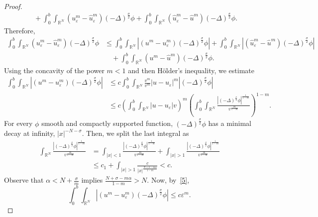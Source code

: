 \documentclass[leqno,12pt]{amsart}
\theoremstyle{definition}
\theoremstyle{remark}
\numberwithin{equation}{section}
\begin{document}
\begin{proof}
\begin{align*}
    &\quad+ \int_{0}^{b}\int_{\mathbb{R}^N}(u_{\varepsilon}^m-\hat{u}_{\varepsilon}^m)(-\Delta)^{\frac\sigma2}\phi+ \int_{0}^{b}\int_{\mathbb{R}^N}(\hat{u}_{\varepsilon}^m-\hat{u}^m)(-\Delta)^{\frac\sigma2}\phi.
\end{align*}
Therefore,
\begin{equation}\label{eq:decomposition}
\begin{aligned}
    \int_{0}^{b}\int_{\mathbb{R}^N}(u_{\varepsilon}^m-\hat{u}_{\varepsilon}^m)(-\Delta)^{\frac\sigma2}\phi&\leq
    \int_{0}^{b}\int_{\mathbb{R}^N}|(u^m-u_{\varepsilon}^m)(-\Delta)^{\frac\sigma2}\phi|
    +\int_{0}^{b}\int_{\mathbb{R}^N}|(\hat{u}_{\varepsilon}^m-\hat{u}^m)(-\Delta)^{\frac\sigma2}\phi|\\
    &\quad +\int_{0}^{b}\int_{\mathbb{R}^N}(u^m-\hat{u}^m)(-\Delta)^{\frac\sigma2}\phi.
\end{aligned}
\end{equation} 
 Using the concavity of the power $m<1$ and then Hölder's inequality, we estimate
\begin{align*}
    \int_{0}^{b}\int_{\mathbb{R}^N}|(u^m-u_{\varepsilon}^m)(-\Delta)^{\frac\sigma2}\phi|&\le c \int_{0}^{b}\int_{\mathbb{R}^N}\frac{v^m}{v^m}|u-u_{\varepsilon}|^m|(-\Delta)^{\frac\sigma2}\phi|
 \\
 &\le c
 \left( \int_{0}^{b}\int_{\mathbb{R}^N}|u-u_{\varepsilon}|v\right)^m
 \left( \int_{0}^{b}\int_{\mathbb{R}^N}\frac{|(- \Delta)^{\frac\sigma2}\phi|^{\frac{1}{1-m}}}{v^{\frac{m}{1-m}}}\right)^{1-m}.
\end{align*}
For every $\phi$ smooth and compactly supported function,  $(-\Delta)^{\frac\sigma2}\phi$ has a minimal decay at infinity, $|x|^{-N-\sigma}$. Then, we split the last integral as
\begin{equation}\label{eq:bound.phi.v}
    \begin{aligned}
        \int_{\mathbb{R}^N} \frac{|(-\Delta)^{\frac\sigma2}\phi|^{\frac{1}{1-m}}}{v^{\frac{m}{1-m}}}&=
        \int_{|x|< 1} \frac{|(-\Delta)^{\frac\sigma2}\phi|^{\frac{1}{1-m}}}{v^{\frac{m}{1-m}}}+ \int_{|x|> 1} \frac{|(-\Delta)^{\frac\sigma2}\phi|^{\frac{1}{1-m}}}{v^{\frac{m}{1-m}}}\\&\leq
        c_1+ \int_{|x|>1} \frac{c}{|x|^{\frac{N+\sigma-m\alpha}{1-m}}}<c.
    \end{aligned}
\end{equation}
Observe that $\alpha<N+\frac{\sigma}{m}$ implies $\frac{N+\sigma-m\alpha}{1-m}>N$. Now, by~\eqref{5},
\[
    \int_{0}^{b}\int_{\mathbb{R}^N}|(u^m-u_{\varepsilon}^m)(-\Delta)^{\frac\sigma2}\phi|\le c\varepsilon^m.
\]
\end{proof}
\end{document}
